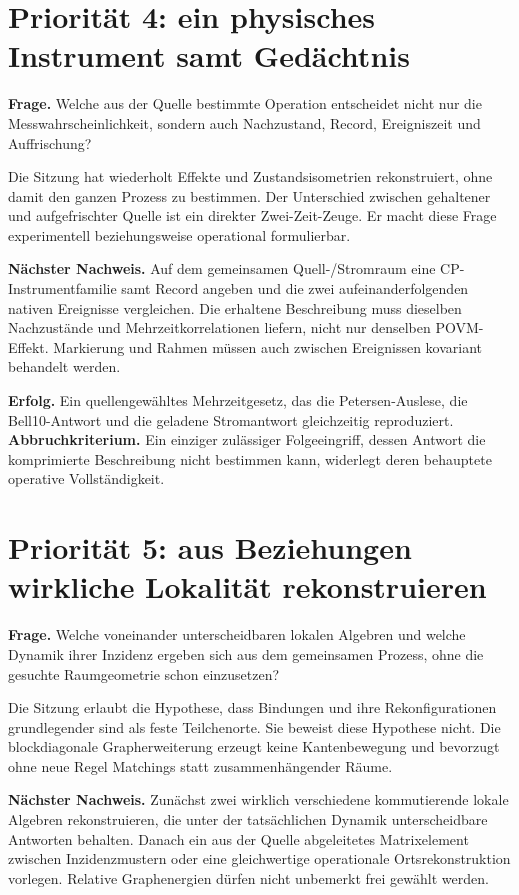 \section{Priorität 4: ein physisches Instrument samt Gedächtnis}
\textbf{Frage.} Welche aus der Quelle bestimmte Operation entscheidet nicht nur die Messwahrscheinlichkeit, sondern auch Nachzustand, Record, Ereigniszeit und Auffrischung?

Die Sitzung hat wiederholt Effekte und Zustandsisometrien rekonstruiert, ohne damit den ganzen Prozess zu bestimmen. Der Unterschied zwischen gehaltener und aufgefrischter Quelle ist ein direkter Zwei-Zeit-Zeuge. Er macht diese Frage experimentell beziehungsweise operational formulierbar.

\textbf{Nächster Nachweis.} Auf dem gemeinsamen Quell-/Stromraum eine CP-Instrumentfamilie samt Record angeben und die zwei aufeinanderfolgenden nativen Ereignisse vergleichen. Die erhaltene Beschreibung muss dieselben Nachzustände und Mehrzeitkorrelationen liefern, nicht nur denselben POVM-Effekt. Markierung und Rahmen müssen auch zwischen Ereignissen kovariant behandelt werden.

\textbf{Erfolg.} Ein quellengewähltes Mehrzeitgesetz, das die Petersen-Auslese, die Bell10-Antwort und die geladene Stromantwort gleichzeitig reproduziert. \textbf{Abbruchkriterium.} Ein einziger zulässiger Folgeeingriff, dessen Antwort die komprimierte Beschreibung nicht bestimmen kann, widerlegt deren behauptete operative Vollständigkeit.

\section{Priorität 5: aus Beziehungen wirkliche Lokalität rekonstruieren}
\textbf{Frage.} Welche voneinander unterscheidbaren lokalen Algebren und welche Dynamik ihrer Inzidenz ergeben sich aus dem gemeinsamen Prozess, ohne die gesuchte Raumgeometrie schon einzusetzen?

Die Sitzung erlaubt die Hypothese, dass Bindungen und ihre Rekonfigurationen grundlegender sind als feste Teilchenorte. Sie beweist diese Hypothese nicht. Die blockdiagonale Grapherweiterung erzeugt keine Kantenbewegung und bevorzugt ohne neue Regel Matchings statt zusammenhängender Räume.

\textbf{Nächster Nachweis.} Zunächst zwei wirklich verschiedene kommutierende lokale Algebren rekonstruieren, die unter der tatsächlichen Dynamik unterscheidbare Antworten behalten. Danach ein aus der Quelle abgeleitetes Matrixelement zwischen Inzidenzmustern oder eine gleichwertige operationale Ortsrekonstruktion vorlegen. Relative Graphenergien dürfen nicht unbemerkt frei gewählt werden.


